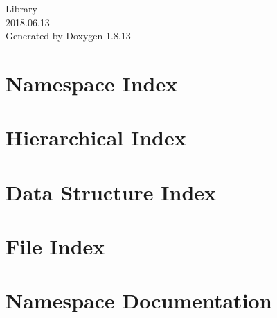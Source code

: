 \documentclass[twoside]{book}
\newcommand{\+}{\discretionary{\mbox{\scriptsize$\hookleftarrow$}}{}{}}
\newcommand{\clearemptydoublepage}{%
  \newpage{\pagestyle{empty}\cleardoublepage}%
}
\begin{document}
\hypersetup{pageanchor=false,
             bookmarksnumbered=true,
             pdfencoding=unicode
            }
\begin{titlepage}
\vspace*{7cm}
\begin{center}%
{\Large Library \\[1ex]\large 2018.\+06.\+13 }\\
\vspace*{1cm}
{\large Generated by Doxygen 1.8.13}\\
\end{center}
\end{titlepage}
\clearemptydoublepage
{}
\tableofcontents
\clearemptydoublepage
{}
\hypersetup{pageanchor=true}

\chapter{Namespace Index}

\chapter{Hierarchical Index}

\chapter{Data Structure Index}

\chapter{File Index}

\chapter{Namespace Documentation}














\end{document}
